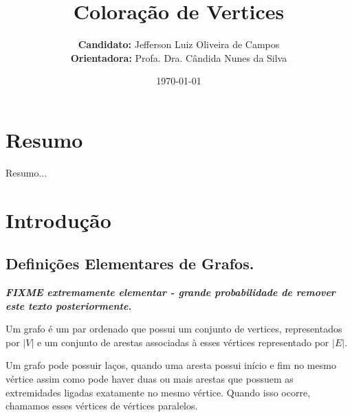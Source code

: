 \documentclass[12pt]{article}
\author{\textbf{Candidato:} Jefferson Luiz Oliveira de Campos\\
        \textbf{Orientadora:} Profa. Dra. Cândida Nunes da Silva}
\title{\textbf{Coloração de Vertices}}
\date{\today}
\begin{document}
\maketitle
\thispagestyle{empty}

\newpage
{}
\tableofcontents

\newpage
{}


\section{Resumo}

Resumo...

\section{Introdução}


\subsection{Definições Elementares de Grafos.}

\textbf{\textit{FIXME extremamente elementar - grande probabilidade de remover este texto posteriormente.}}

Um grafo é um par ordenado que possui um conjunto de vertices, representados por $|V|$ e um conjunto de arestas associadas à esses vértices representado por $|E|$.

Um grafo pode possuir laços, quando uma aresta possui início e fim no mesmo vértice assim como pode haver duas ou mais arestas que possuem as extremidades ligadas exatamente no mesmo vértice. Quando isso ocorre, chamamos esses vértices de vértices paralelos.
\end{document}
